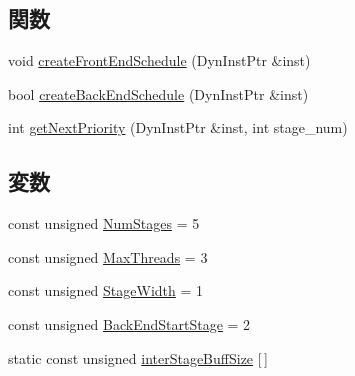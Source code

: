 \subsection*{関数}
\begin{DoxyCompactItemize}
\item 
void \hyperlink{namespaceThePipeline_a47c8cbd46bfdf2ebcec1d556e7bcea01}{createFrontEndSchedule} (DynInstPtr \&inst)
\item 
bool \hyperlink{namespaceThePipeline_abea63cbb0df7d307fa9c239e6fea49e5}{createBackEndSchedule} (DynInstPtr \&inst)
\item 
int \hyperlink{namespaceThePipeline_ac700a8f16a36e0276ea60791d35dbcc2}{getNextPriority} (DynInstPtr \&inst, int stage\_\-num)
\end{DoxyCompactItemize}
\subsection*{変数}
\begin{DoxyCompactItemize}
\item 
const unsigned \hyperlink{namespaceThePipeline_a6918d1731267e5f56969bfb5c240be85}{NumStages} = 5
\item 
const unsigned \hyperlink{namespaceThePipeline_ac9c0bbe9cf27d93e08ea8ccc4096e633}{MaxThreads} = 3
\item 
const unsigned \hyperlink{namespaceThePipeline_ac500730655884fbbec8f152f90582a35}{StageWidth} = 1
\item 
const unsigned \hyperlink{namespaceThePipeline_a1508fbbf00b857ada3c63696ded87cf6}{BackEndStartStage} = 2
\item 
static const unsigned \hyperlink{namespaceThePipeline_a6e9cdd6ec8350737ec1ab5eb73cbe895}{interStageBuffSize} \mbox{[}$\,$\mbox{]}
\end{DoxyCompactItemize}

